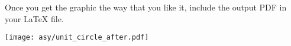 \documentclass{article}
\begin{document}
Once you get the graphic the way that you like it, 
include the output PDF in your \LaTeX{} file.
\begin{center}
  \texttt{[image: asy/unit\_circle\_after.pdf]}
\end{center}
\end{document}
